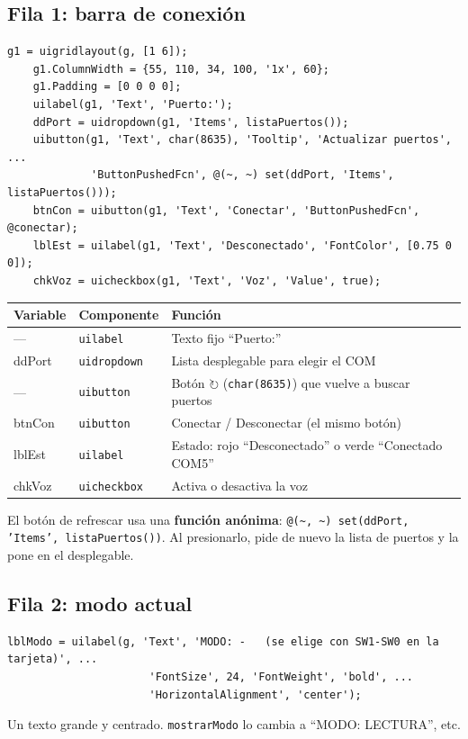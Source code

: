 \documentclass[11pt,a4paper]{article}
\newcommand{\cod}[1]{\texttt{#1}}
\begin{document}
\subsection{Fila 1: barra de conexión}
\begin{lstlisting}[firstnumber=42]
    g1 = uigridlayout(g, [1 6]);
    g1.ColumnWidth = {55, 110, 34, 100, '1x', 60};
    g1.Padding = [0 0 0 0];
    uilabel(g1, 'Text', 'Puerto:');
    ddPort = uidropdown(g1, 'Items', listaPuertos());
    uibutton(g1, 'Text', char(8635), 'Tooltip', 'Actualizar puertos', ...
             'ButtonPushedFcn', @(~, ~) set(ddPort, 'Items', listaPuertos()));
    btnCon = uibutton(g1, 'Text', 'Conectar', 'ButtonPushedFcn', @conectar);
    lblEst = uilabel(g1, 'Text', 'Desconectado', 'FontColor', [0.75 0 0]);
    chkVoz = uicheckbox(g1, 'Text', 'Voz', 'Value', true);
\end{lstlisting}

\begin{center}
\begin{tabular}{>{\ttfamily}l l >{\raggedright\arraybackslash}p{7.5cm}}
\toprule
\normalfont\textbf{Variable} & \textbf{Componente} & \textbf{Función} \\
\midrule
--- & \cod{uilabel} & Texto fijo ``Puerto:'' \\
ddPort & \cod{uidropdown} & Lista desplegable para elegir el COM \\
--- & \cod{uibutton} & Botón $\circlearrowright$ (\cod{char(8635)}) que vuelve a buscar puertos \\
btnCon & \cod{uibutton} & Conectar / Desconectar (el mismo botón) \\
lblEst & \cod{uilabel} & Estado: rojo ``Desconectado'' o verde ``Conectado COM5'' \\
chkVoz & \cod{uicheckbox} & Activa o desactiva la voz \\
\bottomrule
\end{tabular}
\end{center}

El botón de refrescar usa una \textbf{función anónima}:
\cod{@(\textasciitilde, \textasciitilde) set(ddPort, 'Items', listaPuertos())}. Al
presionarlo, pide de nuevo la lista de puertos y la pone en el desplegable.

\subsection{Fila 2: modo actual}
\begin{lstlisting}[firstnumber=54]
    lblModo = uilabel(g, 'Text', 'MODO: -   (se elige con SW1-SW0 en la tarjeta)', ...
                      'FontSize', 24, 'FontWeight', 'bold', ...
                      'HorizontalAlignment', 'center');
\end{lstlisting}
Un texto grande y centrado. \cod{mostrarModo} lo cambia a ``MODO: LECTURA'', etc.
\end{document}
